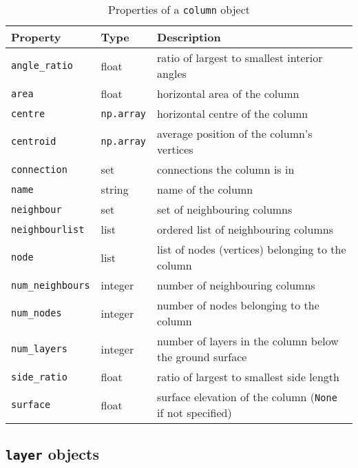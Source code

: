 \begin{table}
  \begin{center}
    \begin{tabular}{|l|l|l|}
      \hline
      \textbf{Property} & \textbf{Type} & \textbf{Description}\\
      \hline
      \texttt{angle\_ratio} & float & ratio of largest to smallest interior angles \\
      \texttt{area} & float & horizontal area of the column \\
      \texttt{centre} & \texttt{np.array} & horizontal centre of the column \\
      \texttt{centroid} & \texttt{np.array} & average position of the column's vertices \\
      \texttt{connection} & set & connections the column is in \\
      \texttt{name} & string & name of the column \\
      \texttt{neighbour} & set & set of neighbouring columns \\
      \texttt{neighbourlist} & list & ordered list of neighbouring columns \\
      \texttt{node} & list & list of nodes (vertices) belonging to the column \\
      \texttt{num\_neighbours} & integer & number of neighbouring columns \\
      \texttt{num\_nodes} & integer & number of nodes belonging to the column \\
      \texttt{num\_layers} & integer & number of layers in the column below the ground surface \\
      \texttt{side\_ratio} & float & ratio of largest to smallest side length \\
      \texttt{surface} & float & surface elevation of the column (\texttt{None} if not specified)\\
      \hline
    \end{tabular}
    \caption{Properties of a \texttt{column} object}
    \label{tb:column_properties}
  \end{center}
\end{table}

\subsection{\texttt{layer} objects}
\label{layerobjects}

